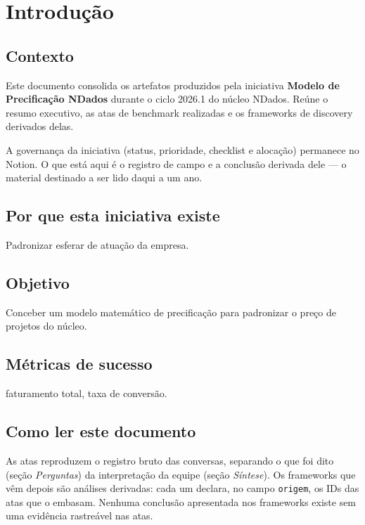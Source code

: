 
\clearpage
\section{Introdução}

\subsection{Contexto}

Este documento consolida os artefatos produzidos pela iniciativa \textbf{Modelo de Precificação NDados} durante o ciclo 2026.1 do núcleo NDados. Reúne o resumo executivo, as atas de benchmark realizadas e os frameworks de discovery derivados delas.

A governança da iniciativa (status, prioridade, checklist e alocação) permanece no Notion. O que está aqui é o registro de campo e a conclusão derivada dele — o material destinado a ser lido daqui a um ano.

\subsection{Por que esta iniciativa existe}

Padronizar esferar de atuação da empresa.

\subsection{Objetivo}

Conceber um modelo matemático de precificação para padronizar o preço de projetos do núcleo.

\subsection{Métricas de sucesso}

faturamento total, taxa de conversão.

\subsection{Como ler este documento}

As atas reproduzem o registro bruto das conversas, separando o que foi dito (seção \emph{Perguntas}) da interpretação da equipe (seção \emph{Síntese}). Os frameworks que vêm depois são análises derivadas: cada um declara, no campo \texttt{origem}, os IDs das atas que o embasam. Nenhuma conclusão apresentada nos frameworks existe sem uma evidência rastreável nas atas.
